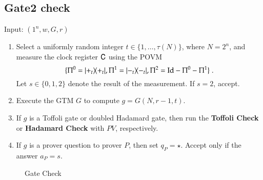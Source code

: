 \subsection{Gate2 check}
\label{sec:prop_check}


\vspace{10pt}
\begin{center}
\begin{mdframed}
    Input: $(1^n,w,G,r)$
	\begin{enumerate}
		\item Select a uniformly random integer $t\in\{1,\ldots, \tau(N)\}$, where $N = 2^n$, and measure the clock register ${\mathsf{C}}$ using the POVM 
\[
	\{ 	\Pi^0 = |+_t\rangle\! \langle +_t|, 
	\Pi^1 = |-_t\rangle\! \langle -_t|, 
	\Pi^2 = \mathop{\mathrm{Id}}\!\mathinner{} - \Pi^0 - \Pi^1 \}\;.
\]	
Let $s \in \{0,1,2\}$ denote the result of the measurement. If $s = 2$, accept.

	\item Execute the GTM $G$ to compute $g = G(N,r-1,t)$. 
	\item If $g$ is a Toffoli gate or doubled Hadamard gate, then run the \textbf{Toffoli Check} or \textbf{Hadamard Check} with $PV$, respectively. 
	\item If $g$ is a prover question to prover $P$, then set $q_P = \star$. Accept only if the answer $a_P = s$.
%	
%	
	\end{enumerate}    
\end{mdframed}

\end{center}
\begin{figure}[H]
\caption{Gate Check}
\label{fig:prop_check}
\end{figure}

